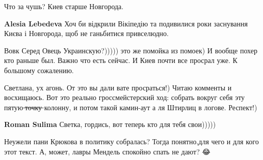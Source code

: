 \begin{itemize}
\begin{itemize}
 
Что за чушь? Киев старше Новгорода.

 
\textbf{Alesia Lebedeva}
Хоч би відкрили Вікіпедію та подивилися роки заснування Києва і Новгорода, щоб не ганьбитися привселюдно.

 
Вовк Серед Овець Украинскую?))))) это же помойка из помоек) И вообще похер кто раньше был. Важно что есть сейчас. И Киев почти все просрал уже. К большому сожалению.
\end{itemize}

 

Светлана, ух агонь. От это вы дали вате просраться!) Читаю комменты и
восхищаюсь. Вот это реально гроссмейстерский ход: собрать вокруг себя эту
пятую ̶т̶о̶ч̶к̶у̶ колонну, и потом такой камин-аут а ля Штирлиц в логове. Респект!)

 
\textbf{Roman Sulima} Светка, гордись, вот теперь кто для тебя свои)))))

 

Неужели пани Крюкова в политику собралась? Тогда понятно,для чего и для кого
этот текст. А, может, лавры Мендель спокойно спать не дают? 😂


\end{itemize}
